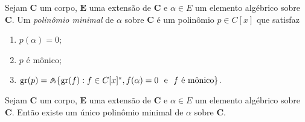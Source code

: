 \begin{definition}
	Sejam $\bm C$ um corpo, $\bm E$ uma extensão de $\bm C$ e $\alpha \in E$ um elemento algébrico sobre $\bm C$. Um \emph{polinômio minimal} de $\alpha$ sobre $\bm C$ é um polinômio $p \in C[x]$ que satisfaz
	\begin{enumerate}
	\item $p(\alpha) = 0$;
	\item $p$ é mônico;
	\item $\g(p) = \min\{\g(f) : f \in C[x]^*, f(\alpha)=0 \e f \text{\ é mônico}\}$.
	\end{enumerate}
\end{definition}

\begin{proposition}
	Sejam $\bm C$ um corpo, $\bm E$ uma extensão de $\bm C$ e $\alpha \in E$ um elemento algébrico sobre $\bm C$. Então existe um único polinômio minimal de $\alpha$ sobre $\bm C$.
\end{proposition}
